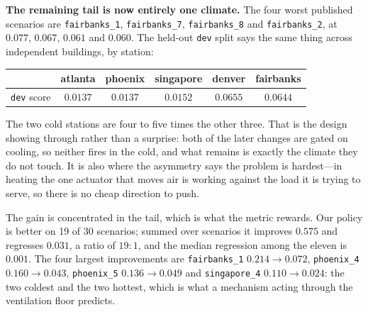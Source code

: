 \documentclass[10pt]{article}
\begin{document}
\textbf{The remaining tail is now entirely one climate.} The four worst
published scenarios are \texttt{fairbanks\_1}, \texttt{fairbanks\_7},
\texttt{fairbanks\_8} and \texttt{fairbanks\_2}, at $0.077$, $0.067$, $0.061$
and $0.060$. The held-out \texttt{dev} split says the same thing across
independent buildings, by station:

\begin{center}
\begin{tabular}{lccccc}
\toprule
 & atlanta & phoenix & singapore & denver & fairbanks \\
\midrule
\texttt{dev} score & $0.0137$ & $0.0137$ & $0.0152$ & $\mathbf{0.0655}$ & $\mathbf{0.0644}$ \\
\bottomrule
\end{tabular}
\end{center}

The two cold stations are four to five times the other three. That is the
design showing through rather than a surprise: both of the later changes are
gated on cooling, so neither fires in the cold, and what remains is exactly
the climate they do not touch. It is also where the asymmetry says the problem
is hardest---in heating the one actuator that moves air is working against the
load it is trying to serve, so there is no cheap direction to push.

The gain is concentrated in the tail, which is what the metric rewards. Our
policy is better on 19 of 30 scenarios; summed over scenarios it improves
$0.575$ and regresses $0.031$, a ratio of $19{:}1$, and the median regression
among the eleven is $0.001$. The four largest improvements are
\texttt{fairbanks\_1} $0.214\!\to\!0.072$, \texttt{phoenix\_4}
$0.160\!\to\!0.043$, \texttt{phoenix\_5} $0.136\!\to\!0.049$ and
\texttt{singapore\_4} $0.110\!\to\!0.024$: the two coldest and the two hottest,
which is what a mechanism acting through the ventilation floor predicts.
\end{document}
